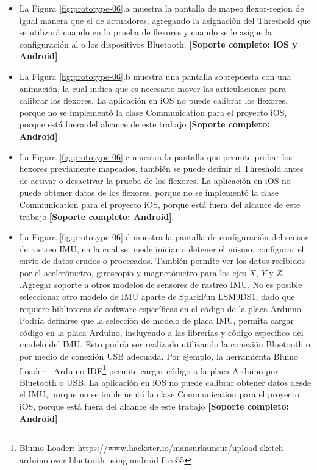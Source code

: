 \begin{itemize}

\item La Figura \ref{fig:prototype-06}.a muestra la pantalla de mapeo flexor-region de igual manera que el de actuadores, agregando la asignación del Threshold que se utilizará cuando en la prueba de flexores y cuando se le asigne la configuración al o los dispositivos Bluetooth. \textbf{[Soporte completo: iOS y Android]}.

\item La Figura \ref{fig:prototype-06}.b muestra una pantalla sobrepuesta con una animación, la cual indica que es necesario mover las articulaciones para calibrar los flexores. La aplicación en iOS no puede calibrar los flexores, porque no se implementó la clase Communication para el proyecto iOS, porque está fuera del alcance de este trabajo \textbf{[Soporte completo: Android]}.

\item La Figura \ref{fig:prototype-06}.c muestra la pantalla que permite probar los flexores previamente mapeados, también se puede definir el Threshold antes de activar o desactivar la prueba de los flexores. La aplicación en iOS no puede obtener datos de los flexores, porque no se implementó la clase Communication para el proyecto iOS, porque está fuera del alcance de este trabajo \textbf{[Soporte completo: Android]}.

\item La Figura \ref{fig:prototype-06}.d muestra la pantalla de configuración del sensor de rastreo IMU, en la cual se puede iniciar o detener el mismo, configurar el envío de datos crudos o procesados. También permite ver los datos recibidos por el acelerómetro, giroscopio y magnetómetro para los ejes $X$, $Y$ y $Z$.Agregar soporte a otros modelos de sensores de rastreo IMU. No es posible seleccionar otro modelo de IMU aparte de SparkFun LSM9DS1, dado que requiere bibliotecas de software específicas en el código de la placa Arduino. Podría definirse que la selección de modelo de placa IMU, permita cargar código en la placa Arduino, incluyendo a las librerías y código específico del modelo del IMU. Esto podría ser realizado utilizando la conexión Bluetooth o por medio de conexión USB adecuada. Por ejemplo, la herramienta Bluino Loader - Arduino IDE\footnote{Bluino Loader: https://www.hackster.io/mansurkamsur/upload-sketch-arduino-over-bluetooth-using-android-f1ce55} permite cargar código a la placa Arduino por Bluetooth o USB. La aplicación en iOS no puede calibrar obtener datos desde el IMU, porque no se implementó la clase Communication para el proyecto iOS, porque está fuera del alcance de este trabajo \textbf{[Soporte completo: Android]}.

\end{itemize}